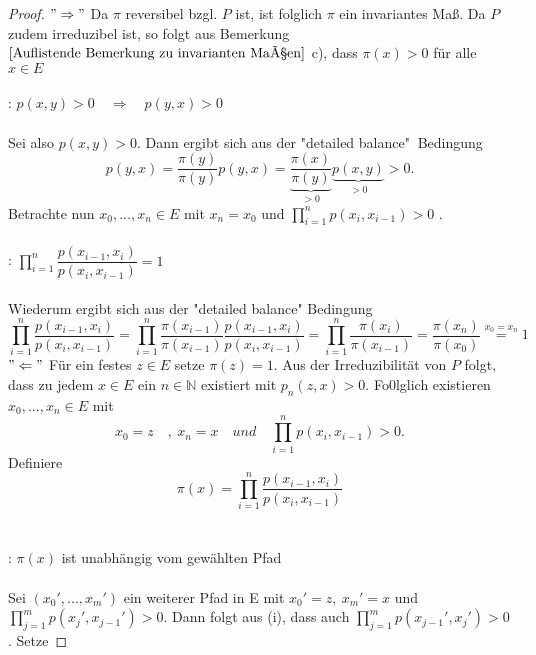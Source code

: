 \documentclass[a4paper,12pt]{scrartcl}
\theoremstyle{definition}
\begin{document}
\begin{proof}
$"\Rightarrow"$ Da $\pi$ reversibel bzgl. $P$ ist, ist folglich $\pi$ ein invariantes Maß. Da $P$ zudem irreduzibel ist, so folgt aus Bemerkung $\ref{Auflistende Bemerkung zu invarianten Maßen}$ c), dass $\pi(x) > 0$ für alle $x \in E$
\\
\\
: $p(x,y)>0 \quad \Rightarrow \quad p(y,x)>0$
\\
\\
Sei also $p(x,y)>0$. Dann ergibt sich aus der "detailed balance"   $\:$Bedingung
\begin{equation*}
p(y,x) = \dfrac{\pi(y)}{\pi(y)} p(y,x) = \underbrace{\dfrac{\pi(x)}{\pi(y)}}_{>0} \underbrace{p(x,y)}_{>0} > 0.
\end{equation*}
Betrachte nun $x_{0},...,x_{n} \in E$ mit $x_{n} = x_{0}$ und  $\prod_{i=1}^{n} p(x_{i},x_{i-1})>0$ .
\\
\\
: $\prod_{i=1}^{n} \dfrac{p(x_{i-1},x_{i})}{p(x_{i},x_{i-1})} = 1$
\\
\\
Wiederum ergibt sich aus der "detailed balance" Bedingung
\begin{equation*}
\prod_{i=1}^{n} \dfrac{p(x_{i-1},x_{i})}{p(x_{i},x_{i-1})} = \prod_{i=1}^{n} \dfrac{\pi(x_{i-1})}{\pi(x_{i-1})} \dfrac{p(x_{i-1},x_{i})}{p(x_{i},x_{i-1})} = \prod_{i=1}^{n} \dfrac{\pi(x_{i})}{\pi(x_{i-1})} = \dfrac{\pi(x_{n})}{\pi(x_{0})} \stackrel{x_{0} = x_{n}}{=} 1
\end{equation*}
$"\Leftarrow"$ Für ein festes $z \in E$ setze $\pi(z) = 1$. Aus der Irreduzibilität von $P$ folgt, dass zu jedem $x \in E$ ein $n \in \mathbb{N}$ existiert mit $p_{n}(z,x) > 0$. Fo0lglich existieren $x_{0},...,x_{n} \in E$ mit
\begin{equation*}
x_{0} = z \quad, \: x_{n} = x \quad und  \quad \prod_{i=1}^{n} p(x_{i},x_{i-1})>0.
\end{equation*}
Definiere
\begin{equation*}
\pi(x) = \prod_{i=1}^{n} \dfrac{p(x_{i-1},x_{i})}{p(x_{i},x_{i-1})}
\end{equation*}
\\
\\
: $\pi(x)$ ist unabhängig vom gewählten Pfad
\\
\\
Sei $(x_{0}',...,x_{m}')$ ein weiterer Pfad in E mit $x_{0}' = z, \: x_{m}' = x$ und $\prod_{j=1}^{m} p(x_{j}',x_{j-1}')>0$. Dann folgt aus (i), dass auch $\prod_{j=1}^{m} p(x_{j-1}',x_{j}')>0$. Setze

\end{proof}
\end{document}
